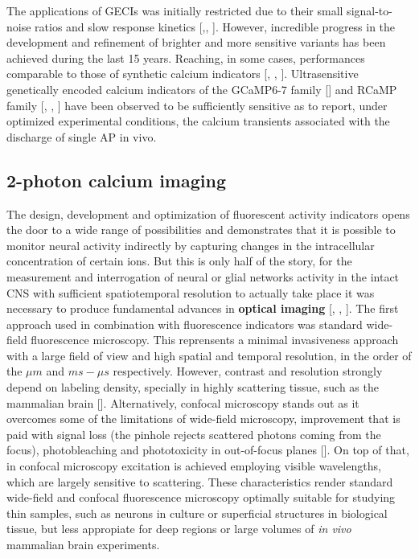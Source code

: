 The applications of GECIs was initially restricted due to their small signal-to-noise ratios and slow response kinetics [\cite{ohkura2005},\cite{tallini2006}, \cite{tian2009}]. 
However, incredible progress in the development and refinement of brighter and more sensitive variants has been achieved during the last 15 years. 
Reaching, in some cases, performances comparable to those of synthetic calcium indicators [\cite{horikawa2010}, \cite{palmer2011}, \cite{akerboom2012}]. 
Ultrasensitive genetically encoded calcium indicators of the GCaMP6-7 family [\cite{chen2013}] and RCaMP family [\cite{akerboom2013}, \cite{dana2016}, \cite{ohkura2012}] have been observed to be sufficiently sensitive as to report, under optimized experimental conditions, the calcium transients associated with the discharge of single AP in vivo.
\subsection{2-photon calcium imaging}
\label{chap1:sec:1:subsec4:2_photon_imaging}

The design, development and optimization of fluorescent activity indicators opens the door to a wide range of possibilities and demonstrates that it is possible to monitor neural activity indirectly by capturing changes in the intracellular concentration of certain ions. 
But this is only half of the story, for the measurement and interrogation of neural or glial networks activity in the intact CNS with sufficient spatiotemporal resolution to actually take place it was necessary to produce fundamental advances in \textbf{optical imaging} [\cite{grienberger2012}, \cite{bovetti2014}, \cite{yang2017}].
The first approach used in combination with fluorescence indicators was standard wide-field fluorescence microscopy.
This reprensents a minimal invasiveness approach with a large field of view and high spatial and temporal resolution, in the order of the $\mu m$ and $ms-\mu s$ respectively.
However, contrast and resolution strongly depend on labeling density, specially in highly scattering tissue, such as the mammalian brain [\cite{denk1997}].
Alternatively, confocal microscopy stands out as it overcomes some of the limitations of wide-field microscopy, improvement that is paid with signal loss (the pinhole rejects scattered photons coming from the focus), photobleaching and phototoxicity in out-of-focus planes [\cite{pawley2006}]. 
On top of that, in confocal microscopy excitation is achieved employing visible wavelengths, which are largely sensitive to scattering. 
These characteristics render standard wide-field and confocal fluorescence microscopy optimally suitable for studying thin samples, such as neurons in culture or superficial structures in biological tissue, but less appropiate for deep regions or large volumes of \textit{in vivo} mammalian brain experiments. 

